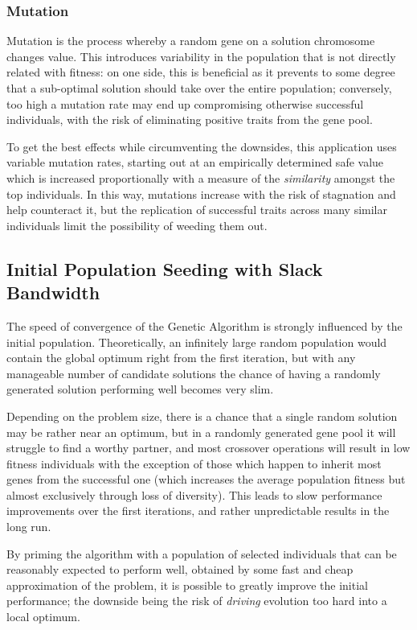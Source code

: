 \subsubsection{Mutation}
Mutation is the process whereby a random gene on a solution chromosome changes value.
This introduces variability in the population that is not directly related with fitness: on one side, this is beneficial as it prevents to some degree that a sub-optimal solution should take over the entire population; conversely, too high a mutation rate may end up compromising otherwise successful individuals, with the risk of eliminating positive traits from the gene pool.

To get the best effects while circumventing the downsides, this application uses variable mutation rates, starting out at an empirically determined safe value which is increased proportionally with a measure of the \emph{similarity} amongst the top individuals. In this way, mutations increase with the risk of stagnation and help counteract it, but the replication of successful traits across many similar individuals limit the possibility of weeding them out.

\subsection{Initial Population Seeding with Slack Bandwidth} \label{s:seeding}
The speed of convergence of the Genetic Algorithm is strongly influenced by the initial population.
Theoretically, an infinitely large random population would contain the global optimum right from the first iteration, but with any manageable number of candidate solutions the chance of having a randomly generated solution performing well becomes very slim.

Depending on the problem size, there is a chance that a single random solution may be rather near an optimum, but in a randomly generated gene pool it will struggle to find a worthy partner, and most crossover operations will result in low fitness individuals with the exception of those which happen to inherit most genes from the successful one (which increases the average population fitness but almost exclusively through loss of diversity). This leads to slow performance improvements over the first iterations, and rather unpredictable results in the long run.

By priming the algorithm with a population of selected individuals that can be reasonably expected to perform well, obtained by some fast and cheap approximation of the problem, it is possible to greatly improve the initial performance; the downside being the risk of \emph{driving} evolution too hard into a local optimum.

